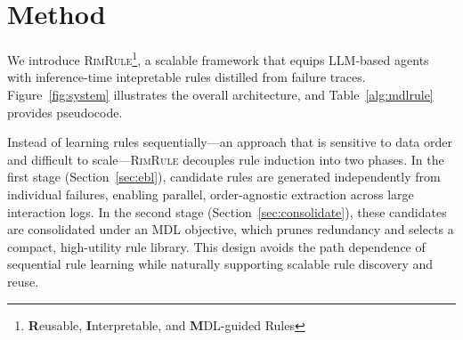 \documentclass[11pt]{article}
\newcommand{\shortname}{\textsc{RimRule}\xspace}
\begin{document}



\section{Method}




We introduce \shortname\footnote{\textbf{R}eusable, \textbf{I}nterpretable, and \textbf{M}DL-guided Rules}, a scalable framework that equips LLM-based agents with inference-time intepretable rules distilled from failure traces. 
Figure~\ref{fig:system} illustrates the overall architecture, and Table~\ref{alg:mdlrule} provides pseudocode.


Instead of learning rules sequentially—an approach that is sensitive to data order and difficult to scale—\shortname decouples rule induction into two phases. In the first stage (Section~\ref{sec:ebl}), candidate rules are generated independently from individual failures, enabling parallel, order-agnostic extraction across large interaction logs. In the second stage (Section~\ref{sec:consolidate}), these candidates are consolidated under an MDL objective, which prunes redundancy and selects a compact, high-utility rule library. This design avoids the path dependence of sequential rule learning while naturally supporting scalable rule discovery and reuse. 



\end{document}
